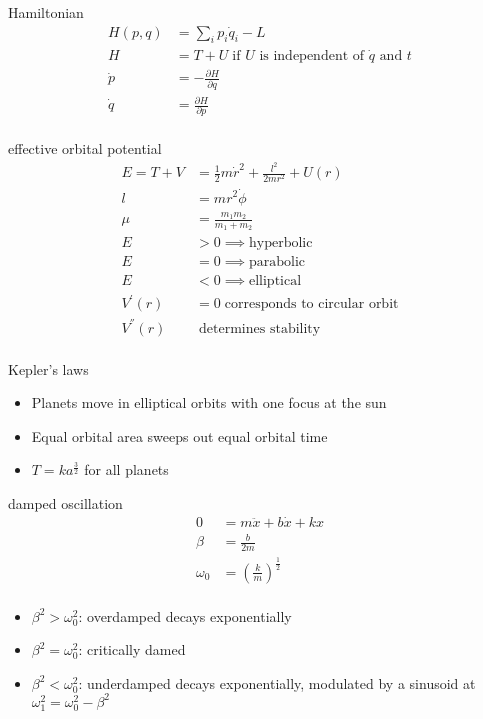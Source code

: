 \documentclass[avery5388, frame, grid]{flashcards}
\begin{document}
\begin{flashcard}{Hamiltonian}
  {
    \begin{align*}
      H(p, q) &= \sum_{i} p_{i} \dot{q}_{i} - L\\
      H &= T + U \; \textrm{if $U$ is independent of $\dot{q}$ and $t$}\\
      \dot{p} &= - \frac{\partial H}{\partial q}\\
      \dot{q} &= \frac{\partial H}{\partial p}\\
    \end{align*}
  }
\end{flashcard}

\begin{flashcard}{effective orbital potential}
  {
    \begin{align*}
      E = T + V &= \frac{1}{2} m \dot{r}^{2} + \frac{l^2}{2 m r^{2}} + U(r)\\
      l &= m r^{2} \dot{\phi}\\
      \mu &= \frac{m_{1} m_{2}}{m_{1} + m_{2}}\\
      E &> 0 \implies \textrm{hyperbolic}\\
      E &= 0 \implies \textrm{parabolic}\\
      E &< 0 \implies \textrm{elliptical}\\
      V^{'}(r) &= 0 \; \textrm{corresponds to circular orbit}\\
      V^{''}(r)& \; \textrm{determines stability}\\
    \end{align*}
  }
\end{flashcard}

\begin{flashcard}{Kepler's laws}
  {
    \begin{itemize}
    \item Planets move in elliptical orbits with one focus at the sun
    \item Equal orbital area sweeps out equal orbital time
    \item $T = ka^{\frac{3}{2}}$ for all planets
    \end{itemize}
  }
\end{flashcard}

\begin{flashcard}{damped oscillation}
  {
    \begin{align*}
      0 &= m\ddot{x} + b\dot{x} + kx \\
      \beta &= \frac{b}{2m}\\
      \omega_{0} &= (\frac{k}{m})^{\frac{1}{2}}\\
    \end{align*}
  }
  {
    \begin{itemize}
    \item $\beta^{2} > \omega_{0}^{2}$: overdamped decays exponentially
    \item $\beta^{2} = \omega_{0}^{2}$: critically damed
    \item $\beta^{2} < \omega_{0}^{2}$: underdamped decays exponentially, modulated by a sinusoid at $\omega_{1}^{2} = \omega_{0}^{2} - \beta^{2}$
    \end{itemize}
  }
\end{flashcard}
\end{document}
